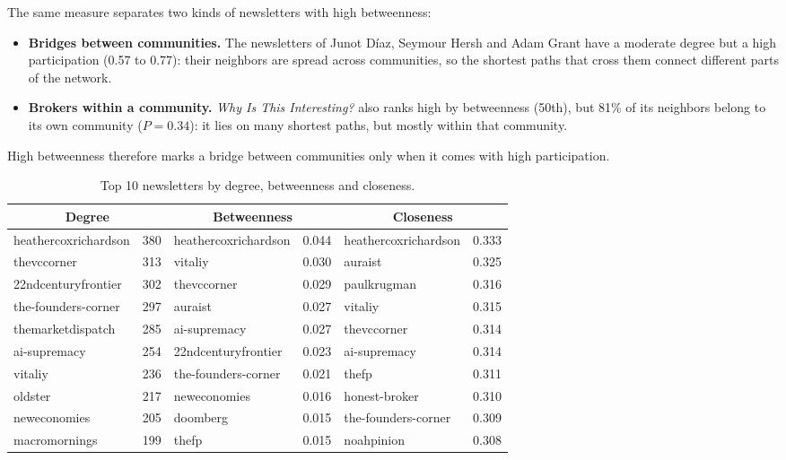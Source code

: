 \documentclass[sigchi]{acmart}
\begin{document}
The same measure separates two kinds of newsletters with high
betweenness:
\begin{itemize}
  \item \textbf{Bridges between communities.} The newsletters of Junot
  D\'iaz, Seymour Hersh and Adam Grant have a moderate degree but a high
  participation (0.57 to 0.77): their neighbors are spread across
  communities, so the shortest paths that cross them connect different
  parts of the network.
  \item \textbf{Brokers within a community.} \emph{Why Is This
  Interesting?} also ranks high by betweenness (50th), but 81\% of its
  neighbors belong to its own community ($P=0.34$): it lies on many
  shortest paths, but mostly within that community.
\end{itemize}
High betweenness therefore marks a bridge between communities only
when it comes with high participation.

\begin{table}[t]
  \centering
  \caption{Top 10 newsletters by degree, betweenness and closeness.}
  \label{tab:centrality}
  \begin{tabular}{lrlrlr}
    \toprule
    \multicolumn{2}{c}{\textbf{Degree}} & \multicolumn{2}{c}{\textbf{Betweenness}} & \multicolumn{2}{c}{\textbf{Closeness}} \\
    \midrule
    heathercoxrichardson & 380 & heathercoxrichardson & 0.044 & heathercoxrichardson & 0.333 \\
    thevccorner & 313 & vitaliy & 0.030 & auraist & 0.325 \\
    22ndcenturyfrontier & 302 & thevccorner & 0.029 & paulkrugman & 0.316 \\
    the-founders-corner & 297 & auraist & 0.027 & vitaliy & 0.315 \\
    themarketdispatch & 285 & ai-supremacy & 0.027 & thevccorner & 0.314 \\
    ai-supremacy & 254 & 22ndcenturyfrontier & 0.023 & ai-supremacy & 0.314 \\
    vitaliy & 236 & the-founders-corner & 0.021 & thefp & 0.311 \\
    oldster & 217 & neweconomies & 0.016 & honest-broker & 0.310 \\
    neweconomies & 205 & doomberg & 0.015 & the-founders-corner & 0.309 \\
    macromornings & 199 & thefp & 0.015 & noahpinion & 0.308 \\
    \bottomrule
  \end{tabular}
\end{table}
\end{document}

